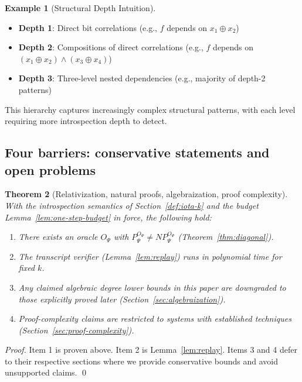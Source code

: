 \documentclass[11pt]{article}
\newtheorem{theorem}{Theorem}[section]
\theoremstyle{plain}
\theoremstyle{definition}
\newtheorem{example}[theorem]{Example}
\newcommand{\PSi}{\Psi}
\begin{document}
\begin{example}[Structural Depth Intuition]
\begin{itemize}
\item \textbf{Depth 1}: Direct bit correlations (e.g., $f$ depends on $x_1 \oplus x_2$)
\item \textbf{Depth 2}: Compositions of direct correlations (e.g., $f$ depends on $(x_1 \oplus x_2) \wedge (x_3 \oplus x_4)$)
\item \textbf{Depth 3}: Three-level nested dependencies (e.g., majority of depth-2 patterns)
\end{itemize}
This hierarchy captures increasingly complex structural patterns, with each level requiring more introspection depth to detect.
\end{example}


\subsection{Four barriers: conservative statements and open problems}

\begin{theorem}[Relativization, natural proofs, algebraization, proof complexity]
With the introspection semantics of Section~\ref{def:iota-k} and the budget Lemma~\ref{lem:one-step-budget} in force, the following hold:
\begin{enumerate}
  \item There exists an oracle $O_\PSi$ with $P^{O_\PSi}_\PSi \neq NP^{O_\PSi}_\PSi$ (Theorem~\ref{thm:diagonal}).
  \item The transcript verifier (Lemma~\ref{lem:replay}) runs in polynomial time for fixed $k$.
  \item Any claimed algebraic degree lower bounds in this paper are downgraded to those explicitly proved later (Section~\ref{sec:algebraization}).
  \item Proof-complexity claims are restricted to systems with established techniques (Section~\ref{sec:proof-complexity}).
\end{enumerate}
\end{theorem}
\begin{proof}
Item 1 is proven above. Item 2 is Lemma~\ref{lem:replay}. Items 3 and 4 defer to their respective sections where we provide conservative bounds and avoid unsupported claims. \qed
\end{proof}
\end{document}
